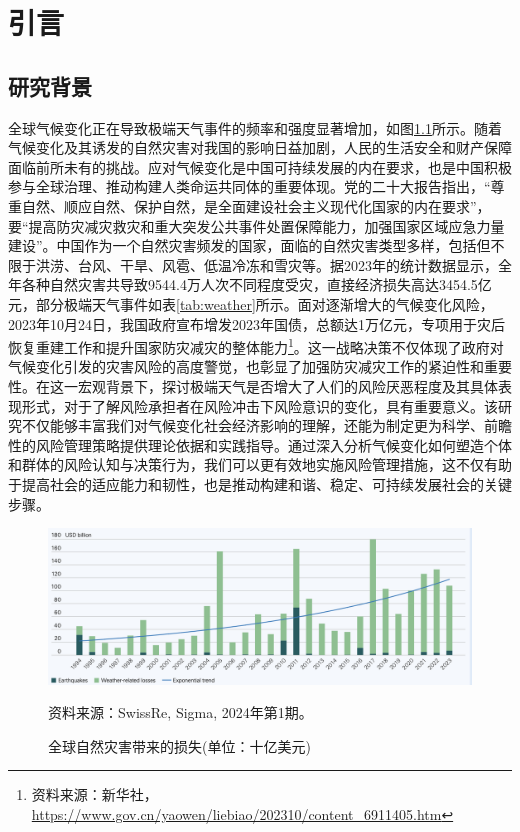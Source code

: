 \chapter{引言}
\section{研究背景}
全球气候变化正在导致极端天气事件的频率和强度显著增加，如图\ref{fig:swissre}所示。随着气候变化及其诱发的自然灾害对我国的影响日益加剧，人民的生活安全和财产保障面临前所未有的挑战。应对气候变化是中国可持续发展的内在要求，也是中国积极参与全球治理、推动构建人类命运共同体的重要体现。党的二十大报告指出，“尊重自然、顺应自然、保护自然，是全面建设社会主义现代化国家的内在要求”，要“提高防灾减灾救灾和重大突发公共事件处置保障能力，加强国家区域应急力量建设”。中国作为一个自然灾害频发的国家，面临的自然灾害类型多样，包括但不限于洪涝、台风、干旱、风雹、低温冷冻和雪灾等。据2023年的统计数据显示，全年各种自然灾害共导致9544.4万人次不同程度受灾，直接经济损失高达3454.5亿元，部分极端天气事件如表\ref{tab:weather}所示。面对逐渐增大的气候变化风险，2023年10月24日，我国政府宣布增发2023年国债，总额达1万亿元，专项用于灾后恢复重建工作和提升国家防灾减灾的整体能力\footnote{资料来源：新华社，\url{https://www.gov.cn/yaowen/liebiao/202310/content_6911405.htm}}。这一战略决策不仅体现了政府对气候变化引发的灾害风险的高度警觉，也彰显了加强防灾减灾工作的紧迫性和重要性。在这一宏观背景下，探讨极端天气是否增大了人们的风险厌恶程度及其具体表现形式，对于了解风险承担者在风险冲击下风险意识的变化，具有重要意义。该研究不仅能够丰富我们对气候变化社会经济影响的理解，还能为制定更为科学、前瞻性的风险管理策略提供理论依据和实践指导。通过深入分析气候变化如何塑造个体和群体的风险认知与决策行为，我们可以更有效地实施风险管理措施，这不仅有助于提高社会的适应能力和韧性，也是推动构建和谐、稳定、可持续发展社会的关键步骤。
\begin{figure}[htbp]
    \includegraphics[width=\linewidth]{img/disaster.png}
    \caption{全球自然灾害带来的损失(单位：十亿美元)}\label{fig:swissre}
    资料来源：SwissRe, Sigma, 2024年第1期。
\end{figure}


